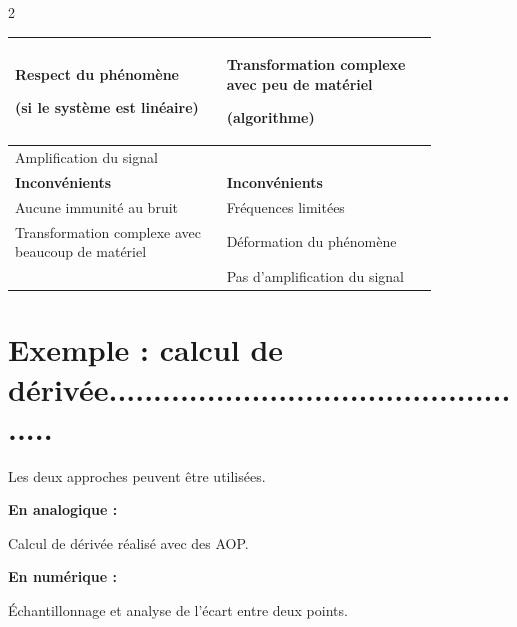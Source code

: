\documentclass[a4paper,9pt]{extarticle}
\begin{document}
\begin{multicols}{2}
\begin{tabular}{|p{0.42\linewidth}|p{0.42\linewidth}|}
Respect du phénomène

(si le système est linéaire)
&
Transformation complexe avec peu de matériel

(algorithme)

\tabularnewline
\hline

Amplification du signal
&

\tabularnewline
\hline

\textbf{Inconvénients}
&
\textbf{Inconvénients}

\tabularnewline
\hline

Aucune immunité au bruit
&
Fréquences limitées

\tabularnewline
\hline

Transformation complexe avec beaucoup de matériel
&
Déformation du phénomène

\tabularnewline
\hline

&
Pas d'amplification du signal

\tabularnewline
\hline

\end{tabular}


\section{Exemple : calcul de dérivée.................................................. }


\begin{example}

Les deux approches peuvent être utilisées.

\vspace{3pt}

\textbf{En analogique :}

Calcul de dérivée réalisé avec des AOP.

\vspace{3pt}

\textbf{En numérique :}

Échantillonnage et analyse de l'écart entre deux points.

\end{example}


\end{multicols}
\end{document}

